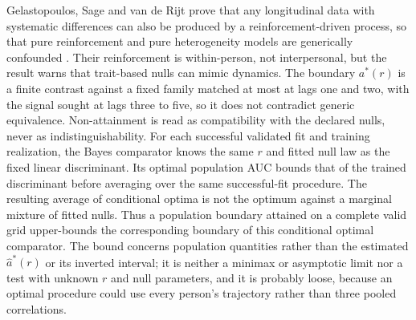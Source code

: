 Gelastopoulos, Sage and van de Rijt prove that any longitudinal data with systematic differences can also be produced by a reinforcement-driven process, so that pure reinforcement and pure heterogeneity models are generically confounded \cite{gelastopoulos2025}.
Their reinforcement is within-person, not interpersonal, but the result warns that trait-based nulls can mimic dynamics. The boundary $a^*(r)$ is a finite contrast against a fixed family matched at most at lags one and two, with the signal sought at lags three to five, so it does not contradict generic equivalence. Non-attainment is read as compatibility with the declared nulls, never as indistinguishability.
For each successful validated fit and training realization, the Bayes comparator knows the same $r$ and fitted null law as the fixed linear discriminant. Its optimal population AUC bounds that of the trained discriminant before averaging over the same successful-fit procedure. The resulting average of conditional optima is not the optimum against a marginal mixture of fitted nulls. Thus a population boundary attained on a complete valid grid upper-bounds the corresponding boundary of this conditional optimal comparator. The bound concerns population quantities rather than the estimated $\hat a^*(r)$ or its inverted interval; it is neither a minimax or asymptotic limit nor a test with unknown $r$ and null parameters, and it is probably loose, because an optimal procedure could use every person's trajectory rather than three pooled correlations.

